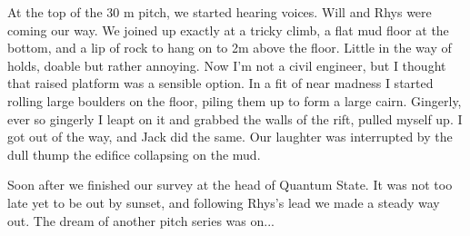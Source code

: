 At the top of the 30 m pitch, we started hearing voices. Will and Rhys were coming our way. We joined up exactly at a tricky climb, a flat mud floor at the bottom, and a lip of rock to hang on to 2m above the floor. Little in the way of holds, doable but rather annoying. Now I'm not a civil engineer, but I thought that raised platform was a sensible option. In a fit of near madness I started rolling large boulders on the floor, piling them up to form a large cairn. Gingerly, ever so gingerly I leapt on it and grabbed the walls of the rift, pulled myself up. I got out of the way, and Jack did the same. Our laughter was interrupted by the dull thump the edifice collapsing on the mud. 

Soon after we finished our survey at the head of Quantum State. It was not too late yet to be out by sunset, and following Rhys's lead we made a steady way out. The dream of another pitch series was on...

